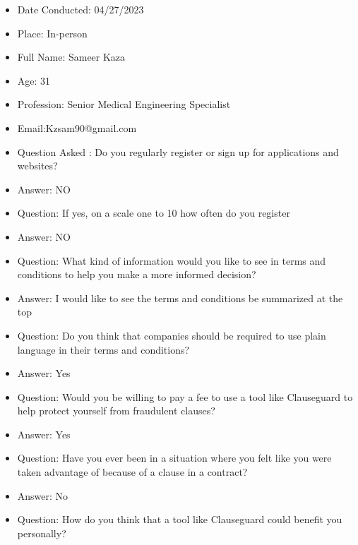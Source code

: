 \begin{itemize}
\item Date Conducted: 04/27/2023
\item Place: In-person
    \item Full Name: Sameer Kaza

    \item Age: 31

    \item Profession: Senior Medical Engineering Specialist  

    \item Email:Kzsam90@gmail.com

    \item Question Asked : Do you regularly register or sign up for applications and websites?

    \item Answer: NO

    \item Question: If yes, on a scale one to 10 how often do you register
    \item Answer: NO

    \item Question: What kind of information would you like to see in terms and conditions to help you make a more informed decision?

    \item Answer: I would like to see the terms and conditions be summarized at the top

    \item Question: Do you think that companies should be required to use plain language in their terms and conditions?

    \item Answer: Yes 

    \item Question: Would you be willing to pay a fee to use a tool like Clauseguard to help protect yourself from fraudulent clauses?

    \item Answer: Yes

    \item Question: Have you ever been in a situation where you felt like you were taken advantage of because of a clause in a contract?

    \item Answer: No

    \item Question: How do you think that a tool like Clauseguard could benefit you personally?


\end{itemize}
